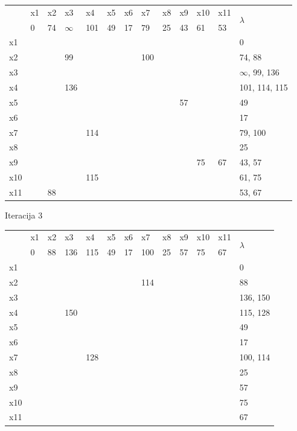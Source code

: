 \documentclass[12pt]{article}
\begin{document}
\begin{table}[hp]
\centering
\begin{tabular}{|l|l|l|l|l|l|l|l|l|l|l|l|l|}
\hline
\multirow{2}{*}{} & x1 & x2 & x3 & x4 & x5 & x6 & x7 & x8 & x9 & x10 & x11 & \multirow{2}{*}{$\lambda$} \\ \cline{2-12}
 & 0 & 74 & $\infty$ & 101 & 49 & 17 & 79 & 25 & 43 & 61 & 53 &  \\ \hline
x1 &  &  &  &  &  &  &  &  &  &  &  & 0 \\ \hline
x2 &  &  & 99 &  &  &  & 100 &  &  &  &  & 74, 88 \\ \hline
x3 &  &  &  &  &  &  &  &  &  &  &  & $\infty$, 99, 136 \\ \hline
x4 &  &  & 136 &  &  &  &  &  &  &  &  & 101, 114, 115 \\ \hline
x5 &  &  &  &  &  &  &  &  & 57 &  &  & 49 \\ \hline
x6 &  &  &  &  &  &  &  &  &  &  &  & 17 \\ \hline
x7 &  &  &  & 114 &  &  &  &  &  &  &  & 79, 100 \\ \hline
x8 &  &  &  &  &  &  &  &  &  &  &  & 25 \\ \hline
x9 &  &  &  &  &  &  &  &  &  & 75 & 67 & 43, 57 \\ \hline
x10 &  &  &  & 115 &  &  &  &  &  &  &  & 61, 75 \\ \hline
x11 &  & 88 &  &  &  &  &  &  &  &  &  & 53, 67 \\ \hline
\end{tabular}
\end{table}

\newpage

Iteracija 3
\begin{table}[hp]
\centering
\begin{tabular}{|l|l|l|l|l|l|l|l|l|l|l|l|l|}
\hline
\multirow{2}{*}{} & x1 & x2 & x3 & x4 & x5 & x6 & x7 & x8 & x9 & x10 & x11 & \multirow{2}{*}{$\lambda$} \\ \cline{2-12}
 & 0 & 88 & 136 & 115 & 49 & 17 & 100 & 25 & 57 & 75 & 67 &  \\ \hline
x1 &  &  &  &  &  &  &  &  &  &  &  & 0 \\ \hline
x2 &  &  &  &  &  &  & 114 &  &  &  &  & 88 \\ \hline
x3 &  &  &  &  &  &  &  &  &  &  &  & 136, 150 \\ \hline
x4 &  &  & 150 &  &  &  &  &  &  &  &  & 115, 128 \\ \hline
x5 &  &  &  &  &  &  &  &  &  &  &  & 49 \\ \hline
x6 &  &  &  &  &  &  &  &  &  &  &  & 17 \\ \hline
x7 &  &  &  & 128 &  &  &  &  &  &  &  & 100, 114 \\ \hline
x8 &  &  &  &  &  &  &  &  &  &  &  & 25 \\ \hline
x9 &  &  &  &  &  &  &  &  &  &  &  & 57 \\ \hline
x10 &  &  &  &  &  &  &  &  &  &  &  & 75 \\ \hline
x11 &  &  &  &  &  &  &  &  &  &  &  & 67 \\ \hline
\end{tabular}
\end{table}
\end{document}
